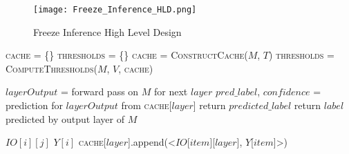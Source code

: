 \documentclass[letterpaper,twocolumn,10pt]{article}
\begin{document}
\label{sec:design}

\begin{figure}[t!]
  \centering
    \texttt{[image: Freeze\_Inference\_HLD.png]}
    \caption{Freeze Inference High Level Design}
    \label{fig:freeze_hld}
\end{figure}

\begin{algorithm}[t!]
\begin{scriptsize}
\begin{algorithmic}[1]
\State \textsc{cache} = \{\} 
\State \textsc{thresholds} = \{\} 
\State{}
\label{offline_phase}
       \State \textsc{cache} = \textsc{ConstructCache}($M$, $T$)
       \State \textsc{thresholds} = \textsc{ComputeThresholds}($M$, $V$, \textsc{cache})
\EndProcedure
\State{}

\label{start_hld_inference}
                \State $layerOutput$ = forward pass on $M$ for next $layer$
                \State $pred\_label$, $confidence$ = prediction for $layerOutput$ from \textsc{cache}[$layer$]
                       \State return $predicted\_label$
                \EndIf
       \EndFor
       \State return $label$ predicted by output layer of $M$
\EndProcedure \label{end_hld_freeze}
\State{}

 \label{start_construct_cache}
    \State $IO[i][j]$ 
    \State $Y[i]$ 
            \State \textsc{cache}[$layer$].append(<$IO$[$item$][$layer$], $Y$[$item$]>)
        \EndFor
    \EndFor
\EndProcedure \label{end_construct_cache}
\State{}


\end{algorithmic}
\end{scriptsize}
\end{algorithm}
\end{document}
